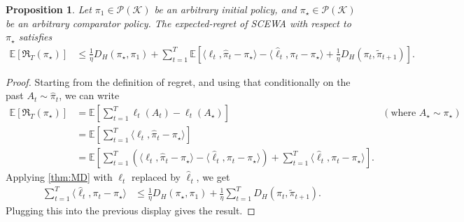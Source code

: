 \documentclass{article}
\theoremstyle{plain}
\newtheorem{proposition}[theorem]{Proposition}
\theoremstyle{definition}
\theoremstyle{plain}
\newcommand{\Reg}{\mathfrak{R}}
\newcommand{\E}{\mathbb E}
\newcommand{\K}{\mathcal K}
\newcommand{\cP}{\mathcal P}
\newcommand{\scewaalg}{\textsf{SCEWA}\xspace}
\newcommand{\hf}{\hat{\ell}\xspace}
\begin{document}
\begin{proposition}
    \label{prop:cexp_regret_bound}
    Let $\pi_1 \in \cP(\K)$ be an arbitrary initial policy,
    and $\pi_\star \in \cP(\K)$ be an arbitrary comparator policy.
    The expected-regret of \scewaalg with respect to $\pi_\star$ satisfies
    \begin{align}
        \E[
            \Reg_T(\pi_\star)
        ]
         & \leq
        \frac{1}{\eta}D_H(\pi_\star,\pi_1)
        +
        \sum_{t=1}^T
        \E\left[
            \langle \ell_t,\hat{\pi}_t-\pi_\star\rangle
            -
            \langle \hf_t,\pi_t-\pi_\star\rangle
            +
            \frac{1}{\eta}
            D_{H}
            \left(
            \pi_t,
            \tilde{\pi}_{t+1}
            \right)
            \right].
    \end{align}
\end{proposition}

\begin{proof}
    Starting from the definition of regret, and using that conditionally on the past
    $A_t\sim \hat{\pi}_t$, we can write
    \begin{align}
        \E[\Reg_T(\pi_\star)]
         & =
        \E\left[
            \sum_{t=1}^T
            \ell_t(A_t) - \ell_t(A_\star)
            \right]
         & (\text{where } A_\star \sim \pi_\star)
        \\
         & =
        \E\left[
            \sum_{t=1}^T
            \langle \ell_t,\hat{\pi}_t-\pi_\star\rangle
        \right]                                   \\
         & =
        \E\left[
            \sum_{t=1}^T
            \left(
            \langle \ell_t,\hat{\pi}_t-\pi_\star\rangle
            -
            \langle \hf_t,\pi_t-\pi_\star\rangle
            \right)
            +
            \sum_{t=1}^T
            \langle \hf_t,\pi_t-\pi_\star\rangle
            \right].
    \end{align}
    Applying \cref{thm:MD} with $\ell_t$ replaced by $\hf_t$, we get
    \begin{align}
        \sum_{t=1}^T
        \langle \hf_t,\pi_t-\pi_\star\rangle
         & \leq
        \frac{1}{\eta}D_H(\pi_\star,\pi_1)
        +
        \frac{1}{\eta}
        \sum_{t=1}^T
        D_H(\pi_t,\tilde{\pi}_{t+1}).
    \end{align}
    Plugging this into the previous display gives the result.
\end{proof}
\end{document}
